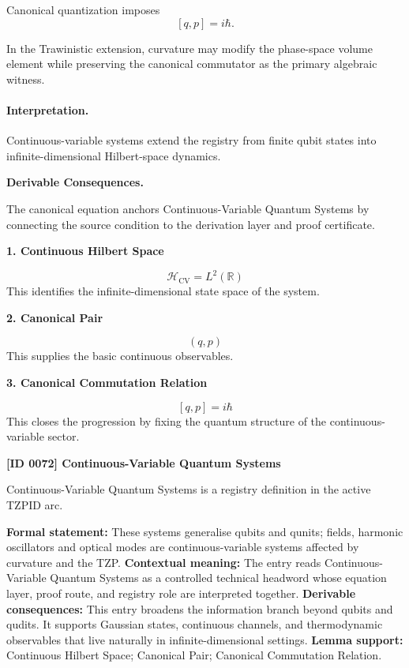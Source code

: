 Canonical quantization imposes
\begin{equation}
\boxed{
[q,p]=i\hbar .
}
\end{equation}

In the Trawinistic extension, curvature may modify the phase-space volume element while preserving the canonical commutator as the primary algebraic witness.

\paragraph{Interpretation.}
Continuous-variable systems extend the registry from finite qubit states into infinite-dimensional Hilbert-space dynamics.

\par\vspace{0.35em}
\noindent\textbf{Derivable Consequences.}\quad
\begingroup
\footnotesize
\raggedright
The canonical equation anchors Continuous-Variable Quantum Systems by connecting the source condition to the derivation layer and proof certificate.
\par\endgroup

\noindent\textbf{1. Continuous Hilbert Space}\par
\[
\mathcal{H}_{\mathrm{CV}} = L^{2}(\mathbb{R})
\]
\noindent This identifies the infinite-dimensional state space of the system.\par
\noindent\textbf{2. Canonical Pair}\par
\[
(q,p)
\]
\noindent This supplies the basic continuous observables.\par
\noindent\textbf{3. Canonical Commutation Relation}\par
\[
\left[q,p\right] = i\hbar
\]
\noindent This closes the progression by fixing the quantum structure of the continuous-variable sector.\par

\clearpage
\noindent\textbf{[ID 0072] Continuous-Variable Quantum Systems}\par
\vspace{0.35em}
\begingroup\small
{}
Continuous-Variable Quantum Systems is a registry definition in the active TZPID arc.

\begingroup\footnotesize\setlength{\emergencystretch}{3em}\sloppy
\textbf{Formal statement:} These systems generalise qubits and qunits; fields, harmonic oscillators and optical modes are continuous-variable systems affected by curvature and the TZP. \textbf{Contextual meaning:} The entry reads Continuous-Variable Quantum Systems as a controlled technical headword whose equation layer, proof route, and registry role are interpreted together. \textbf{Derivable consequences:} This entry broadens the information branch beyond qubits and qudits. It supports Gaussian states, continuous channels, and thermodynamic observables that live naturally in infinite-dimensional settings. \textbf{Lemma support:} Continuous Hilbert Space; Canonical Pair; Canonical Commutation Relation.\par
\endgroup

